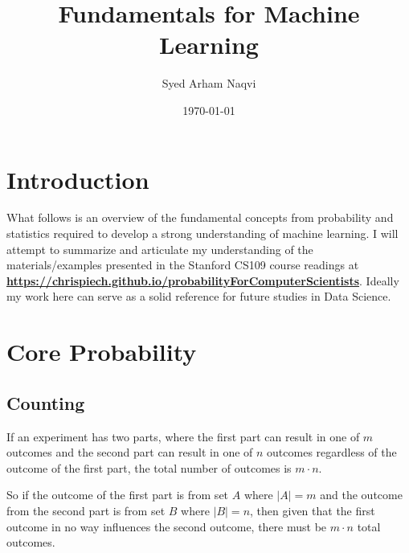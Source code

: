 \documentclass[11pt]{article}
\title{Fundamentals for Machine Learning}
\author{Syed Arham Naqvi}
\date{\today}
\newcommand{\BF}{\textbf}
\begin{document}
\maketitle
\tableofcontents
\newpage

\section{Introduction}

What follows is an overview of the fundamental concepts from probability and statistics required to develop a strong understanding
of machine learning. I will attempt to summarize and articulate my understanding of the materials/examples presented in the Stanford CS109
course readings at \BF{\underline{https://chrispiech.github.io/probabilityForComputerScientists}}. Ideally my work here can serve as a
solid reference for future studies in Data Science.
\newpage

\section{Core Probability}
\subsection{Counting}


\begin{definition}
    If an experiment has two parts, where the first part can result in one of $m$ outcomes and the second part can result in one of $n$
    outcomes regardless of the outcome of the first part, the total number of outcomes is $m \cdot n$.
\end{definition}
So if the outcome of the first part is from set $A$ where $|A|=m$ and the outcome from the second part is from set $B$ where $|B|=n$, then
given that the first outcome in no way influences the second outcome, there must be $m\cdot n$ total outcomes.
\end{document}
